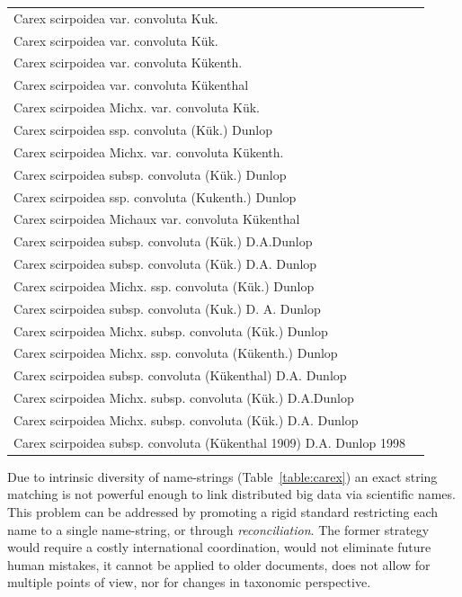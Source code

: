 \documentclass{bmcart}
\begin{document}
\begin{table}[!htb]
\begin{center}
\begin{tabular}{| l | c |}
    Carex scirpoidea var. convoluta Kuk. & \\
    Carex scirpoidea var. convoluta Kük. & \\
    Carex scirpoidea var. convoluta Kükenth. & \\
    Carex scirpoidea var. convoluta Kükenthal & \\
    Carex scirpoidea Michx. var. convoluta Kük. & \\
    Carex scirpoidea ssp. convoluta (Kük.) Dunlop & \\
    Carex scirpoidea Michx. var. convoluta Kükenth. & \\
    Carex scirpoidea subsp. convoluta (Kük.) Dunlop & \\
    Carex scirpoidea ssp. convoluta (Kukenth.) Dunlop & \\
    Carex scirpoidea Michaux var. convoluta Kükenthal & \\
    Carex scirpoidea subsp. convoluta (Kük.) D.A.Dunlop & \\
    Carex scirpoidea subsp. convoluta (Kük.) D.A. Dunlop & \\
    Carex scirpoidea Michx. ssp. convoluta (Kük.) Dunlop & \\
    Carex scirpoidea subsp. convoluta (Kuk.) D. A. Dunlop & \\
    Carex scirpoidea Michx. subsp. convoluta (Kük.) Dunlop & \\
    Carex scirpoidea Michx. ssp. convoluta (Kükenth.) Dunlop & \\
    Carex scirpoidea subsp. convoluta (Kükenthal) D.A. Dunlop & \\
    Carex scirpoidea Michx. subsp. convoluta (Kük.) D.A.Dunlop & \\
    Carex scirpoidea Michx. subsp. convoluta (Kük.) D.A. Dunlop & \\
    Carex scirpoidea subsp. convoluta (Kükenthal 1909) D.A. Dunlop 1998 & \\
    \hline
    \end{tabular}
  \end{center}
\end{table}

Due to intrinsic diversity of name-strings (Table~\ref{table:carex}) an exact
string matching is not powerful enough to link distributed big data via
scientific names. This problem can be addressed by promoting a rigid standard
restricting each name to a single name-string, or through
\textit{reconciliation}. The former strategy would require a costly
international coordination, would not eliminate future human mistakes, it
cannot be applied to older documents, does not allow for multiple points of
view, nor for changes in taxonomic perspective.
\end{document}
